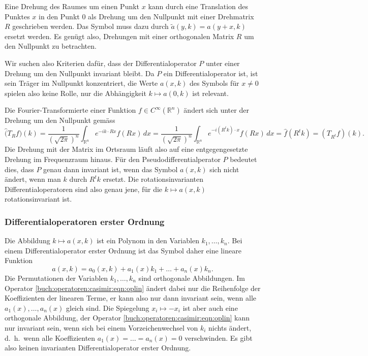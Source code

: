 Eine Drehung des Raumes um einen Punkt $x$ kann durch eine Translation
des Punktes $x$ in den Punkt $0$ als Drehung um den Nullpunkt
mit einer Drehmatrix $R$ geschrieben werden.
Das Symbol muss dazu durch $\tilde{a}(y,k) = a(y+x,k)$ ersetzt werden.
Es genügt also, Drehungen mit einer orthogonalen Matrix $R$ um den
Nullpunkt zu betrachten.

Wir suchen also Kriterien dafür, dass der Differentialoperator $P$ unter
einer Drehung um den Nullpunkt invariant bleibt.
Da $P$ ein Differentialoperator ist, ist sein Träger im Nullpunkt
konzentriert, die Werte $a(x,k)$ des Symbols für $x\ne 0$ spielen also
keine Rolle, nur die Abhängigkeit $k\mapsto a(0,k)$ ist relevant.

Die Fourier-Transformierte einer Funktion $f\in C^{\infty}(\mathbb{R}^n)$
ändert sich unter der Drehung um den Nullpunkt gemäss
\[
\widehat(T_Rf)(k)
=
\frac{1}{(\!\sqrt{2\pi})^n}
\int_{\mathbb{R}^n}
e^{-ik\cdot Rx}
f(Rx)\,dx
=
\frac{1}{(\!\sqrt{2\pi})^n}
\int_{\mathbb{R}^n}
e^{-i(R^tk)\cdot x}
f(Rx)\,dx
=
\hat{f}(R^tk)
=
(T_{R^t}f)(k).
\]
Die Drehung mit der Matrix im Ortsraum läuft also auf eine entgegengesetzte
Drehung im Frequenzraum hinaus.
Für den Pseudodifferentialperator $P$ bedeutet dies, dass $P$ genau dann
invariant ist, wenn das Symbol $a(x,k)$ sich nicht ändert, wenn man $k$ durch
$R^tk$ ersetzt.
Die rotationsinvarianten Differentialoperatoren sind also genau jene, 
für die $k\mapsto a(x,k)$ rotationsinvariant ist.

%
%
\subsubsection{Differentialoperatoren erster Ordnung}
Die Abbildung $k\mapsto a(x,k)$ ist ein Polynom in den Variablen
$k_1,\dots,k_n$.
Bei einem Differentialoperator erster Ordnung ist das Symbol daher
eine lineare Funktion
\begin{equation}
a(x,k)
=
a_0(x,k)
+
a_1(x)k_1
+
\dots
+
a_n(x)k_n.
\label{buch:operatoren:casimir:eqn:oplin}
\end{equation}
Die Permutationen der Variablen $k_1,\dots,k_n$ sind orthogonale Abbildungen.
Im Operator \eqref{buch:operatoren:casimir:eqn:oplin} ändert dabei nur
die Reihenfolge der Koeffizienten der linearen Terme, er kann also nur dann
invariant sein, wenn alle $a_1(x),\dots,a_n(x)$ gleich sind.
Die Spiegelung $x_i\mapsto -x_i$ ist aber auch eine orthogonale Abbildung,
der Operator \eqref{buch:operatoren:casimir:eqn:oplin} kann nur invariant
sein, wenn sich bei einem Vorzeichenwechsel von $k_i$ nichts ändert,
d.~h.~wenn alle Koeffizienten $a_1(x)=\dots = a_n(x)=0$ verschwinden.
Es gibt also keinen invarianten Differentialoperator erster Ordnung.

